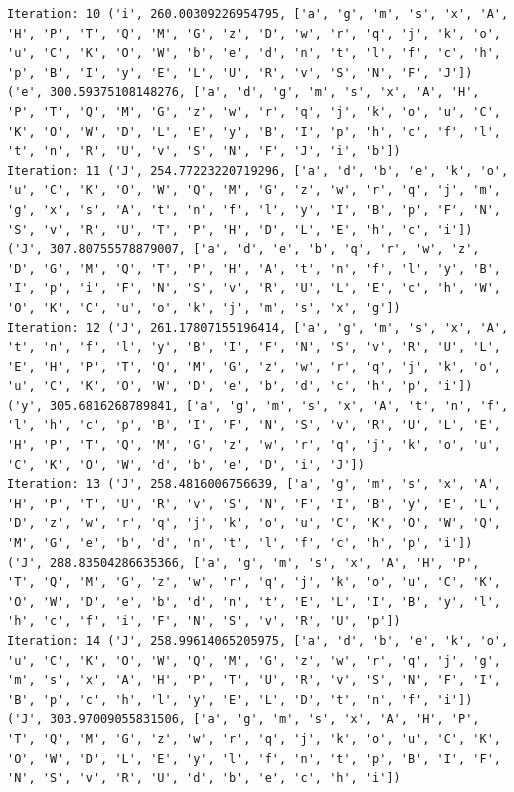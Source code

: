 \documentclass[11pt]{article}
\begin{document}
\begin{lstlisting}
Iteration: 10 ('i', 260.00309226954795, ['a', 'g', 'm', 's', 'x', 'A', 'H', 'P', 'T', 'Q', 'M', 'G', 'z', 'D', 'w', 'r', 'q', 'j', 'k', 'o', 'u', 'C', 'K', 'O', 'W', 'b', 'e', 'd', 'n', 't', 'l', 'f', 'c', 'h', 'p', 'B', 'I', 'y', 'E', 'L', 'U', 'R', 'v', 'S', 'N', 'F', 'J']) ('e', 300.59375108148276, ['a', 'd', 'g', 'm', 's', 'x', 'A', 'H', 'P', 'T', 'Q', 'M', 'G', 'z', 'w', 'r', 'q', 'j', 'k', 'o', 'u', 'C', 'K', 'O', 'W', 'D', 'L', 'E', 'y', 'B', 'I', 'p', 'h', 'c', 'f', 'l', 't', 'n', 'R', 'U', 'v', 'S', 'N', 'F', 'J', 'i', 'b'])
Iteration: 11 ('J', 254.77223220719296, ['a', 'd', 'b', 'e', 'k', 'o', 'u', 'C', 'K', 'O', 'W', 'Q', 'M', 'G', 'z', 'w', 'r', 'q', 'j', 'm', 'g', 'x', 's', 'A', 't', 'n', 'f', 'l', 'y', 'I', 'B', 'p', 'F', 'N', 'S', 'v', 'R', 'U', 'T', 'P', 'H', 'D', 'L', 'E', 'h', 'c', 'i']) ('J', 307.80755578879007, ['a', 'd', 'e', 'b', 'q', 'r', 'w', 'z', 'D', 'G', 'M', 'Q', 'T', 'P', 'H', 'A', 't', 'n', 'f', 'l', 'y', 'B', 'I', 'p', 'i', 'F', 'N', 'S', 'v', 'R', 'U', 'L', 'E', 'c', 'h', 'W', 'O', 'K', 'C', 'u', 'o', 'k', 'j', 'm', 's', 'x', 'g'])
Iteration: 12 ('J', 261.17807155196414, ['a', 'g', 'm', 's', 'x', 'A', 't', 'n', 'f', 'l', 'y', 'B', 'I', 'F', 'N', 'S', 'v', 'R', 'U', 'L', 'E', 'H', 'P', 'T', 'Q', 'M', 'G', 'z', 'w', 'r', 'q', 'j', 'k', 'o', 'u', 'C', 'K', 'O', 'W', 'D', 'e', 'b', 'd', 'c', 'h', 'p', 'i']) ('y', 305.6816268789841, ['a', 'g', 'm', 's', 'x', 'A', 't', 'n', 'f', 'l', 'h', 'c', 'p', 'B', 'I', 'F', 'N', 'S', 'v', 'R', 'U', 'L', 'E', 'H', 'P', 'T', 'Q', 'M', 'G', 'z', 'w', 'r', 'q', 'j', 'k', 'o', 'u', 'C', 'K', 'O', 'W', 'd', 'b', 'e', 'D', 'i', 'J'])
Iteration: 13 ('J', 258.4816006756639, ['a', 'g', 'm', 's', 'x', 'A', 'H', 'P', 'T', 'U', 'R', 'v', 'S', 'N', 'F', 'I', 'B', 'y', 'E', 'L', 'D', 'z', 'w', 'r', 'q', 'j', 'k', 'o', 'u', 'C', 'K', 'O', 'W', 'Q', 'M', 'G', 'e', 'b', 'd', 'n', 't', 'l', 'f', 'c', 'h', 'p', 'i']) ('J', 288.83504286635366, ['a', 'g', 'm', 's', 'x', 'A', 'H', 'P', 'T', 'Q', 'M', 'G', 'z', 'w', 'r', 'q', 'j', 'k', 'o', 'u', 'C', 'K', 'O', 'W', 'D', 'e', 'b', 'd', 'n', 't', 'E', 'L', 'I', 'B', 'y', 'l', 'h', 'c', 'f', 'i', 'F', 'N', 'S', 'v', 'R', 'U', 'p'])
Iteration: 14 ('J', 258.99614065205975, ['a', 'd', 'b', 'e', 'k', 'o', 'u', 'C', 'K', 'O', 'W', 'Q', 'M', 'G', 'z', 'w', 'r', 'q', 'j', 'g', 'm', 's', 'x', 'A', 'H', 'P', 'T', 'U', 'R', 'v', 'S', 'N', 'F', 'I', 'B', 'p', 'c', 'h', 'l', 'y', 'E', 'L', 'D', 't', 'n', 'f', 'i']) ('J', 303.97009055831506, ['a', 'g', 'm', 's', 'x', 'A', 'H', 'P', 'T', 'Q', 'M', 'G', 'z', 'w', 'r', 'q', 'j', 'k', 'o', 'u', 'C', 'K', 'O', 'W', 'D', 'L', 'E', 'y', 'l', 'f', 'n', 't', 'p', 'B', 'I', 'F', 'N', 'S', 'v', 'R', 'U', 'd', 'b', 'e', 'c', 'h', 'i'])

\end{lstlisting}
\end{document}
